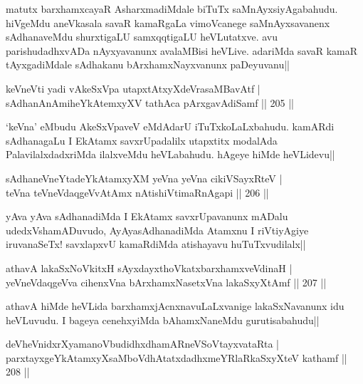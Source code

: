 \begin{artha}%
matutx barxhamxcayaR AsharxmadiMdale biTuTx saMnAyxsiyAgabahudu. hiVgeMdu aneVkasala savaR kamaRgaLa vimoVcanege saMnAyxsavanenx sAdhanaveMdu shurxtigaLU samxqqtigaLU heVLutatxve. avu parishudadhxvADa nAyxyavanunx avalaMBisi heVLive. adariMda savaR kamaR tAyxgadiMdale sAdhakanu bArxhamxNayxvanunx paDeyuvanu||
\end{artha}

\begin{shl}
keVneVti yadi vA\s \s keSxVpa utapxtAtxyXdeVrasaMBavAtf |\\
sAdhanAnAmiheYkAtemxyXV tathAca pArxgavAdiSamf \hfill || 205 ||
\end{shl}

\begin{artha}
`keVna' eMbudu AkeSxVpaveV eMdAdarU iTuTxkoLaLxbahudu. kamARdi sAdhanagaLu I EkAtamx savxrUpadalilx utapxtitx modalAda PalavilalxdadxriMda ilalxveMdu heVLabahudu. hAgeye hiMde heVLidevu||
\end{artha}


\begin{shl}
sAdhaneVneYtadeYkAtamxyXM yeVna yeVna cikiVSayxRteV |\\
teVna teVneVdaqgeVvA\s \s tAmx nAtishiVtimaRnAgapi \hfill || 206 ||
\end{shl}

\begin{artha}
yAva yAva sAdhanadiMda I EkAtamx savxrUpavanunx mADalu udedxVshamADuvudo, AyAyasAdhanadiMda Atamxnu I riVtiyAgiye iruvanaSeTx! savxlapxvU kamaRdiMda atishayavu huTuTxvudilalx||
\end{artha}

\begin{shl}
athavA lakaSxNoVkitxH sAyxdayxthoVkatxbarxhamxveVdinaH |\\
yeVneVdaqgeVva cihenxVna bArxhamxNasetxVna lakaSxyXtAmf \hfill || 207 ||
\end{shl}

\begin{artha}%
athavA hiMde heVLida barxhamxjAcnxnavuLaLxvanige lakaSxNavanunx idu heVLuvudu. I bageya cenehxyiMda bAhamxNaneMdu gurutisabahudu||
\end{artha}

\begin{shl}
deVheVnidxrXyamanoVbudidhxdhamARneVSoV\s tayxvataRta |\\
parxtayxgeYkAtamxyXsaMboVdhAtatxdadhxmeYRlaRkaSxyXteV kathamf \hfill || 208 ||
\end{shl}

